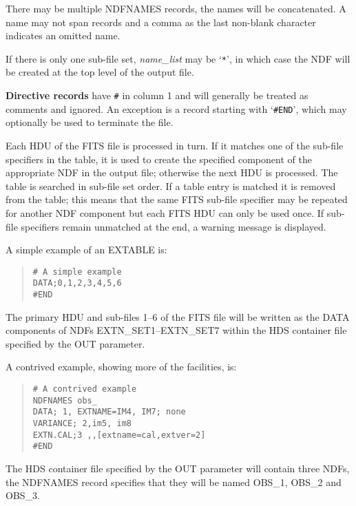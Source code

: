 \documentclass[twoside,11pt]{starlink}
\begin{document}
{{{           There may be multiple NDFNAMES records, the names will be
           concatenated.  A name may not span records and a comma as the last
           non-blank character indicates an omitted name.

           If there is only one sub-file set, \textit{name\_list} may be
           `\texttt{*}',
           in which case the NDF will be created at the top level of the output
           file.
           \medskip

        \textbf{Directive records} have \texttt{\#} in column 1 and will
           generally be treated
           as comments and ignored.  An exception is a record starting with
           `\texttt{\#END}', which may optionally be used to terminate the file.

        Each HDU of the FITS file is processed in turn. If it matches one
        of the sub-file specifiers in the table, it is used to create the
        specified component of the appropriate NDF in the output file;
        otherwise the next HDU is processed. The table is searched in
        sub-file set order.
        If a table entry is matched it is removed from the table; this
        means that the same FITS sub-file specifier may be repeated for
        another NDF component but each FITS HDU can only be used once.
        If sub-file specifiers remain unmatched at the end, a warning
        message is displayed.
        \bigskip

        A simple example of an EXTABLE is:
        \begin{quote}
          \texttt{\# A simple example\\
          DATA;0,1,2,3,4,5,6\\
          \#END}
        \end{quote}
        The primary HDU and sub-files 1--6 of the FITS file will be written
        as the DATA components of NDFs EXTN\_SET1--EXTN\_SET7 within the HDS
        container file specified by the OUT parameter.

        A contrived example, showing more of the facilities, is:
        \begin{quote}
          \texttt{\# A contrived example\\
          NDFNAMES obs\_\\
          DATA; 1, EXTNAME=IM4, IM7; none\\
          VARIANCE; 2,im5, im8\\
          EXTN.CAL;3 ,,[extname=cal,extver=2]\\
          \#END}
        \end{quote}
        The HDS container file specified by the OUT parameter will contain
        three NDFs, the NDFNAMES record specifies that they will be named
        OBS\_1, OBS\_2 and OBS\_3.

}}}
\end{document}

